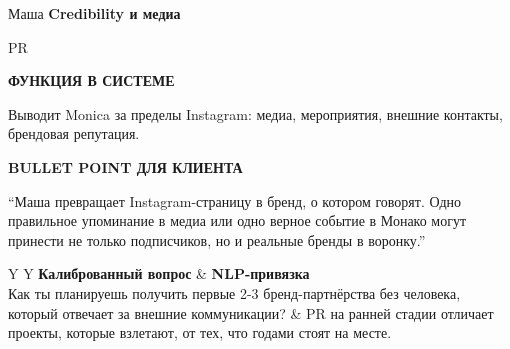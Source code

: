 \documentclass[11pt,a4paper]{article}
\newcommand{\minititle}[1]{{\sansfont\bfseries\fontsize{9.5}{11}\selectfont\color{rose}\MakeUppercase{#1}}}
\begin{document}
\begin{glassbox}
{\headingfont\fontsize{18}{20}\selectfont Маша}\hfill
{\sansfont\bfseries\color{emerald} Credibility и медиа}

{\color{muted} PR}

\vspace{2mm}
\begin{softbox}[colback=paperbg]
\minititle{Функция в системе}\par
Выводит Monica за пределы Instagram: медиа, мероприятия, внешние контакты, брендовая репутация.
\end{softbox}
\vspace{2mm}
\begin{softbox}[colback=paperbg]
\minititle{Bullet Point для клиента}\par
``Маша превращает Instagram-страницу в бренд, о котором говорят. Одно правильное упоминание в медиа или одно верное событие в Монако могут принести не только подписчиков, но и реальные бренды в воронку.''
\end{softbox}
\vspace{2mm}
\begin{tabularx}{\linewidth}{Y Y}
\textbf{Калиброванный вопрос} & \textbf{NLP-привязка} \\
Как ты планируешь получить первые 2-3 бренд-партнёрства без человека, который отвечает за внешние коммуникации? & PR на ранней стадии отличает проекты, которые взлетают, от тех, что годами стоят на месте. \\
\end{tabularx}
\end{glassbox}

\vspace{3mm}
\end{document}
